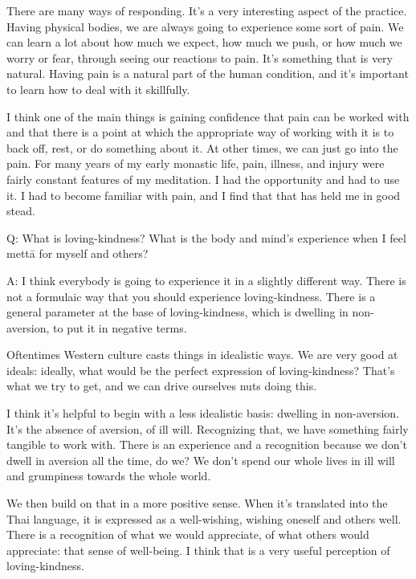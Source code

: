 There are many ways of responding. It’s a very interesting aspect of the
practice. Having physical bodies, we are always going to experience some
sort of pain. We can learn a lot about how much we expect, how much we
push, or how much we worry or fear, through seeing our reactions to
pain. It’s something that is very natural. Having pain is a natural part
of the human condition, and it’s important to learn how to deal with it
skillfully.

I think one of the main things is gaining confidence that pain can be
worked with and that there is a point at which the appropriate way of
working with it is to back off, rest, or do something about it. At other
times, we can just go into the pain. For many years of my early monastic
life, pain, illness, and injury were fairly constant features of my
meditation. I had the opportunity and had to use it. I had to become
familiar with pain, and I find that that has held me in good stead.

\vspace{\the\qaskip}
Q: What is loving-kindness? What is the body and mind’s experience when
I feel mettā for myself and others?

\vspace{\the\qaskip}
A: I think everybody is going to experience it in a slightly different
way. There is not a formulaic way that you should experience
loving-kindness. There is a general parameter at the base of
loving-kindness, which is dwelling in non-aversion, to put it in
negative terms.

Oftentimes Western culture casts things in idealistic ways. We are very
good at ideals: ideally, what would be the perfect expression of
loving-kindness? That’s what we try to get, and we can drive ourselves
nuts doing this.

I think it’s helpful to begin with a less idealistic basis: dwelling in
non-aversion. It’s the absence of aversion, of ill will. Recognizing
that, we have something fairly tangible to work with. There is an
experience and a recognition because we don’t dwell in aversion all the
time, do we? We don’t spend our whole lives in ill will and grumpiness
towards the whole world.

We then build on that in a more positive sense. When it’s translated
into the Thai language, it is expressed as a well-wishing, wishing
oneself and others well. There is a recognition of what we would
appreciate, of what others would appreciate: that sense of well-being. I
think that is a very useful perception of loving-kindness.

